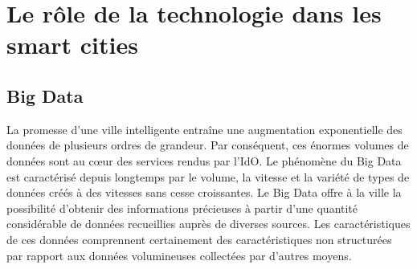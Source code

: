 \documentclass[french, a4paper, 12pt]{report}
\begin{document}


\section{Le rôle de la technologie dans les smart cities}
\subsection{Big Data }
La promesse d'une ville intelligente entraîne une augmentation exponentielle des données de plusieurs ordres de grandeur. Par conséquent, ces énormes volumes de données sont au cœur des services rendus par l'IdO. Le phénomène du Big Data est caractérisé depuis longtemps par le volume, la vitesse et la variété de types de données créés à des vitesses sans cesse croissantes. Le Big Data offre à la ville la possibilité d’obtenir des informations précieuses à partir d’une quantité considérable de données recueillies auprès de diverses sources. Les caractéristiques de ces données comprennent certainement des caractéristiques non structurées par rapport aux données volumineuses collectées par d'autres moyens.
\end{document}
